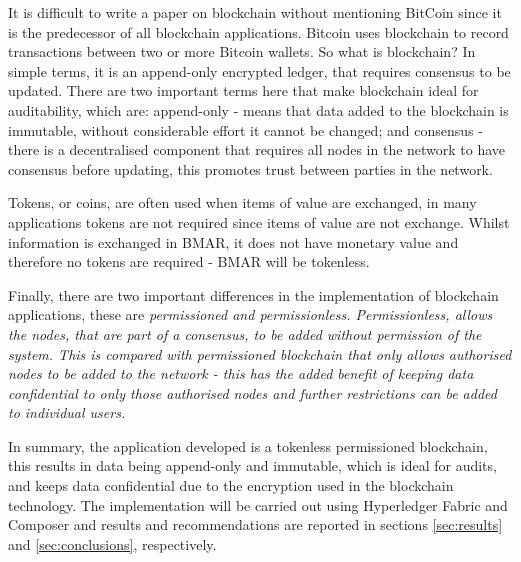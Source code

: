 \documentclass[runningheads]{llncs}
\begin{document}
It is difficult to write a paper on blockchain without mentioning BitCoin \cite{nakamoto2008bitcoin} since it is the predecessor of all blockchain applications. Bitcoin uses blockchain to record transactions between two or more Bitcoin wallets. So what is blockchain? In simple terms, it is an append-only encrypted ledger, that requires consensus to be updated. There are two important terms here that make blockchain ideal for auditability, which are: append-only - means that data added to the blockchain is immutable, without considerable effort it cannot be changed; and consensus \-- there is a decentralised component that requires all nodes in the network to have consensus before updating, this promotes trust between parties in the network. 

Tokens, or coins, are often used when items of value are exchanged, in many applications tokens are not required since items of value are not exchange. Whilst information is exchanged in BMAR, it does not have monetary value and therefore no tokens are required \-- BMAR will be tokenless.

Finally, there are two important differences in the implementation of blockchain applications, these are \em{permissioned} and \em{permissionless}. Permissionless, allows the nodes, that are part of a consensus, to be added without permission of the system. This is compared with permissioned blockchain that only allows authorised nodes to be added to the network \-- this has the added benefit of keeping data confidential to only those authorised nodes and further restrictions can be added to individual users.  

In summary, the application developed is a tokenless permissioned blockchain, this results in data being append-only and immutable, which is ideal for audits, and keeps data confidential due to the encryption used in the blockchain technology. The implementation will be carried out using Hyperledger Fabric and Composer \cite{hyperledger:1,hyperledger:2} and results and recommendations are reported in sections \ref{sec:results} and \ref{sec:conclusions}, respectively.
\end{document}
